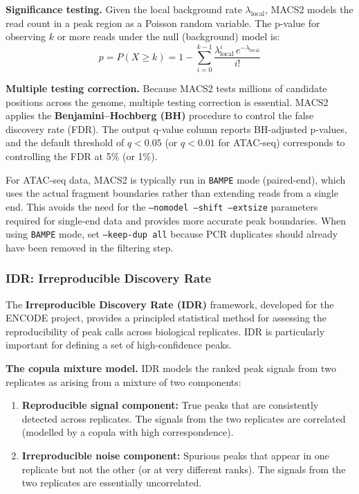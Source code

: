 \textbf{Significance testing.} Given the local background rate $\lambda_{\text{local}}$, MACS2 models the read count in a peak region as a Poisson random variable. The p-value for observing $k$ or more reads under the null (background) model is:
\begin{equation}
\label{eq:chromatin:macs2-pvalue}
p = P(X \geq k) = 1 - \sum_{i=0}^{k-1} \frac{\lambda_{\text{local}}^{i}\, e^{-\lambda_{\text{local}}}}{i!}
\end{equation}

\textbf{Multiple testing correction.} Because MACS2 tests millions of candidate positions across the genome, multiple testing correction is essential. MACS2 applies the \textbf{Benjamini--Hochberg (BH)} procedure to control the false discovery rate (FDR). The output q-value column reports BH-adjusted p-values, and the default threshold of $q < 0.05$ (or $q < 0.01$ for ATAC-seq) corresponds to controlling the FDR at 5\% (or 1\%).

\begin{tipbox}
For ATAC-seq data, MACS2 is typically run in \texttt{BAMPE} mode (paired-end), which uses the actual fragment boundaries rather than extending reads from a single end. This avoids the need for the \texttt{--nomodel --shift --extsize} parameters required for single-end data and provides more accurate peak boundaries. When using \texttt{BAMPE} mode, set \texttt{--keep-dup all} because PCR duplicates should already have been removed in the filtering step.
\end{tipbox}

\subsubsection{IDR: Irreproducible Discovery Rate}
\label{subsubsec:chromatin:idr}

The \textbf{Irreproducible Discovery Rate (IDR)} framework, developed for the ENCODE project, provides a principled statistical method for assessing the reproducibility of peak calls across biological replicates. IDR is particularly important for defining a set of high-confidence peaks.

\textbf{The copula mixture model.} IDR models the ranked peak signals from two replicates as arising from a mixture of two components:
\begin{enumerate}[itemsep=2pt]
  \item \textbf{Reproducible signal component:} True peaks that are consistently detected across replicates. The signals from the two replicates are correlated (modelled by a copula with high correspondence).
  \item \textbf{Irreproducible noise component:} Spurious peaks that appear in one replicate but not the other (or at very different ranks). The signals from the two replicates are essentially uncorrelated.
\end{enumerate}

